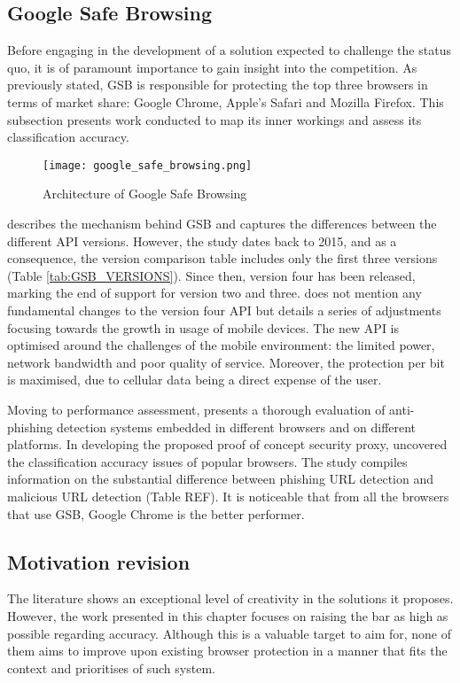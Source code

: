 \subsection{Google Safe Browsing}
\label{subsec:google_safe_browsing}
Before engaging in the development of a solution expected to challenge the status quo, it is of paramount importance to gain insight into the competition. As previously stated, GSB is responsible for protecting the top three browsers in terms of market share: Google Chrome, Apple's Safari and Mozilla Firefox. This subsection presents work conducted to map its inner workings and assess its classification accuracy.

\begin{figure}[h]
	\centering
	\texttt{[image: google\_safe\_browsing.png]}
	\caption{
		Architecture of Google Safe Browsing
		\citep{Priyam_Sandhu}}
	\label{fig:GSB_ARCHITECTURE}
\end{figure}

\cite{Priyam_Sandhu} describes the mechanism behind GSB and captures the differences between the different API versions. However, the study dates back to 2015, and as a consequence, the version comparison table includes only the first three versions (Table \ref{tab:GSB_VERSIONS}). Since then, version four has been released, marking the end of support for version two and three.
\cite{Google} does not mention any fundamental changes to the version four API but details a series of adjustments focusing towards the growth in usage of mobile devices. The new API is optimised around the challenges of the mobile environment: the limited power, network bandwidth and poor quality of service. Moreover, the protection per bit is maximised, due to cellular data being a direct expense of the user.

Moving to performance assessment, \cite{Nikos_Virvilis} presents a thorough evaluation of anti-phishing detection systems embedded in different browsers and on different platforms. In developing the proposed proof of concept security proxy, \cite{Nikos_Virvilis} uncovered the classification accuracy issues of popular browsers. The study compiles information on the substantial difference between phishing URL detection and malicious URL detection (Table REF). It is noticeable that from all the browsers that use GSB, Google Chrome is the better performer.

\subsection{Motivation revision}
\label{subsec:motivation_revision}
The literature shows an exceptional level of creativity in the solutions it proposes. However, the work presented in this chapter focuses on raising the bar as high as possible regarding accuracy. Although this is a valuable target to aim for, none of them aims to improve upon existing browser protection in a manner that fits the context and prioritises of such system.


